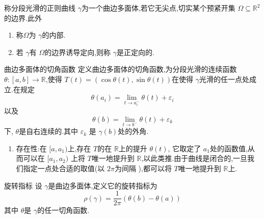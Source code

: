 \documentclass[../../几何与拓扑.tex]{subfiles}
\begin{document}
\begin{definition}
    称分段光滑的正则曲线 \(   \gamma   \)为一个曲边多面体,若它无尖点,切实某个预紧开集 \(   \Omega \subseteq \mathbb{R} ^{2}  \)  的边界.此外
    \begin{enumerate}
        \item 称\(    \Omega   \)为 \(   \gamma   \)的内部.  
        \item 若 \(   \gamma   \)有 \(   \Omega   \)的边界诱导定向,则称 \(   \gamma   \)是正定向的.   
    \end{enumerate}
    
\end{definition}


\begin{definition}{曲边多面体的切角函数}
    定义曲边多面体的切角函数,为分段光滑的连续函数 \(   \theta :\left[ a,b \right]\to \mathbb{R}    \),使得 \(  T\left( t \right)= \left( \cos  \theta \left( t \right),\sin  \theta \left( t \right)   \right)    \)在使得 \(   \gamma   \)光滑的任一点处成立.在规定 \[
     \theta \left( a_{i} \right)= \lim_{t\to a_{i}^{- }}  \theta \left( t \right)+  \varepsilon _{i}  
    \]以及 \[
     \theta \left( b \right)= \lim_{t \to b^{- }} \theta \left( t \right)+  \varepsilon _{k}  
    \]下,     \(   \theta   \)是自右连续的.其中 \(   \varepsilon _{k}  \)  是 \(   \gamma \left( b \right)   \)处的外角. 
\end{definition}

\begin{remark}
    \begin{enumerate}
        \item 存在性:在 \(  [a,a_1)  \)上,存在 \(  T  \)的在 \(  \mathbb{R}   \)上的提升 \(   \theta \left( t \right)   \),    它取定了 \(  a_{1}  \)处的函数值,从而可以在 \(  [a_1,a_2)  \) 上将 \(  T  \)唯一地提升到 \(  \mathbb{R}   \),以此类推.由于曲线是闭合的,一旦我们指定一点处合适的取值(以 \(  2\pi   \)为间隔 ),都可以将 \(  T  \)唯一地提升到 \(  \mathbb{R}   \)上.    
    \end{enumerate}
    
\end{remark}

\begin{definition}{旋转指标}
    设 \(   \gamma   \)是曲边多面体,定义它的旋转指标为 \[
    \rho \left(  \gamma  \right)= \frac{1 }{2\pi  }\left(  \theta \left( b \right)- \theta \left( a \right)   \right)   
    \]其中 \(   \theta   \)是 \(   \gamma   \)的任一切角函数.   
\end{definition}
\end{document}
